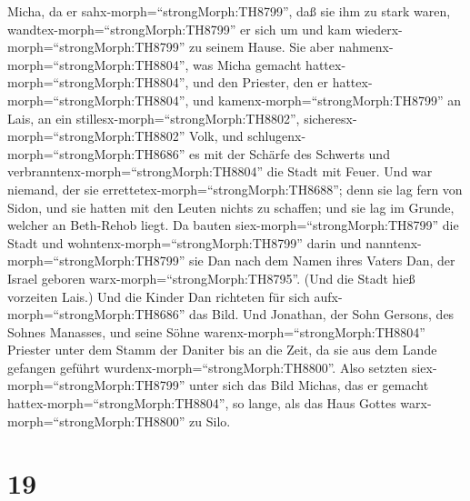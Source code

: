 Micha, da er sahx-morph=``strongMorph:TH8799'', daß sie ihm zu stark
waren, wandtex-morph=``strongMorph:TH8799'' er sich um und kam
wiederx-morph=``strongMorph:TH8799'' zu seinem Hause.  Sie
aber nahmenx-morph=``strongMorph:TH8804'', was Micha gemacht
hattex-morph=``strongMorph:TH8804'', und den Priester, den er
hattex-morph=``strongMorph:TH8804'', und
kamenx-morph=``strongMorph:TH8799'' an Lais, an ein
stillesx-morph=``strongMorph:TH8802'',
sicheresx-morph=``strongMorph:TH8802'' Volk, und
schlugenx-morph=``strongMorph:TH8686'' es mit der Schärfe des Schwerts
und verbranntenx-morph=``strongMorph:TH8804'' die Stadt mit Feuer.
 Und war niemand, der sie
errettetex-morph=``strongMorph:TH8688''; denn sie lag fern von Sidon,
und sie hatten mit den Leuten nichts zu schaffen; und sie lag im Grunde,
welcher an Beth-Rehob liegt. Da bauten siex-morph=``strongMorph:TH8799''
die Stadt und wohntenx-morph=``strongMorph:TH8799'' darin 
und nanntenx-morph=``strongMorph:TH8799'' sie Dan nach dem Namen ihres
Vaters Dan, der Israel geboren warx-morph=``strongMorph:TH8795''. (Und
die Stadt hieß vorzeiten Lais.)  Und die Kinder Dan
richteten für sich aufx-morph=``strongMorph:TH8686'' das Bild. Und
Jonathan, der Sohn Gersons, des Sohnes Manasses, und seine Söhne
warenx-morph=``strongMorph:TH8804'' Priester unter dem Stamm der Daniter
bis an die Zeit, da sie aus dem Lande gefangen geführt
wurdenx-morph=``strongMorph:TH8800''.  Also setzten
siex-morph=``strongMorph:TH8799'' unter sich das Bild Michas, das er
gemacht hattex-morph=``strongMorph:TH8804'', so lange, als das Haus
Gottes warx-morph=``strongMorph:TH8800'' zu Silo.

\hypertarget{section-18}{%
\section{19}\label{section-18}}

